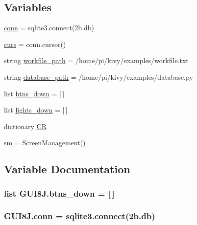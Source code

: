 \subsection*{Variables}
\begin{DoxyCompactItemize}
\item 
\hyperlink{namespaceGUI8J_a4f927d4b54f7b5b67d51112e98813280}{conn} = sqlite3.\+connect(\textquotesingle{}2b.\+db\textquotesingle{})
\item 
\hyperlink{namespaceGUI8J_a9071a3df4f37ae26036b57996e85e7e3}{curs} = conn.\+cursor()
\item 
string \hyperlink{namespaceGUI8J_a6c128a58943c04cd4b39ab866e932cb5}{workfile\+\_\+path} = \textquotesingle{}/home/pi/kivy/examples/workfile.\+txt\textquotesingle{}
\item 
string \hyperlink{namespaceGUI8J_a449cfb95e6ef7bad59eca585bbdbc070}{database\+\_\+path} = \textquotesingle{}/home/pi/kivy/examples/database.\+py\textquotesingle{}
\item 
list \hyperlink{namespaceGUI8J_aeb10edc27f00ab3a8ac6b9bd371825d8}{btns\+\_\+down} = \mbox{[}$\,$\mbox{]}
\item 
list \hyperlink{namespaceGUI8J_a974cb7ffd4fb84577faa81105a676fe6}{lights\+\_\+down} = \mbox{[}$\,$\mbox{]}
\item 
dictionary \hyperlink{namespaceGUI8J_a22559156071a0e55de6499cb7c11bc13}{CR}
\item 
\hyperlink{namespaceGUI8J_adcbadd2e4d3eb82dc0f961f439e9b394}{sm} = \hyperlink{classGUI8J_1_1ScreenManagement}{Screen\+Management}()
\end{DoxyCompactItemize}


\subsection{Variable Documentation}
\subsubsection[{\texorpdfstring{btns\+\_\+down}{btns_down}}]{\setlength{\rightskip}{0pt plus 5cm}list G\+U\+I8\+J.\+btns\+\_\+down = \mbox{[}$\,$\mbox{]}}\hypertarget{namespaceGUI8J_aeb10edc27f00ab3a8ac6b9bd371825d8}{}\label{namespaceGUI8J_aeb10edc27f00ab3a8ac6b9bd371825d8}
\subsubsection[{\texorpdfstring{conn}{conn}}]{\setlength{\rightskip}{0pt plus 5cm}G\+U\+I8\+J.\+conn = sqlite3.\+connect(\textquotesingle{}2b.\+db\textquotesingle{})}\hypertarget{namespaceGUI8J_a4f927d4b54f7b5b67d51112e98813280}{}\label{namespaceGUI8J_a4f927d4b54f7b5b67d51112e98813280}
